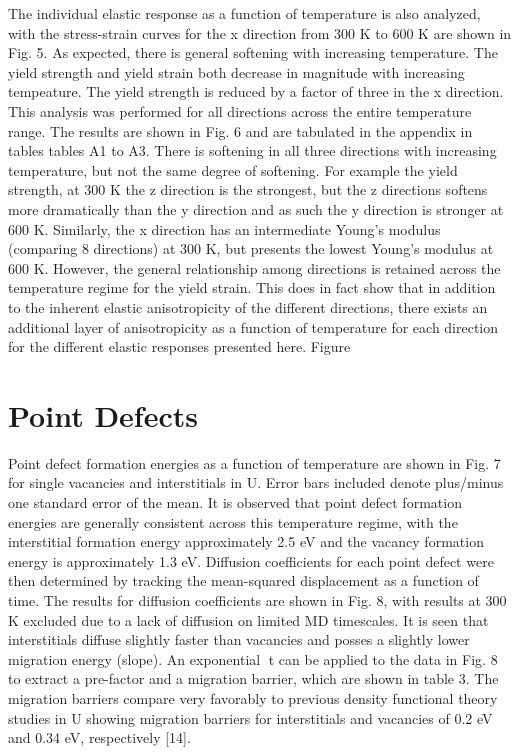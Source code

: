 \documentclass[review]{elsarticle}
\begin{document}
The individual elastic response as a function of temperature is also analyzed, with the stress-strain curves
for the x direction from 300 K to 600 K are shown in Fig. 5. As expected, there is general softening with
increasing temperature. The yield strength and yield strain both decrease in magnitude with increasing
tempeature. The yield strength is reduced by a factor of three in the x direction. This analysis was
performed for all directions across the entire temperature range. The results are shown in Fig. 6 and are
tabulated in the appendix in tables tables A1 to A3. There is softening in all three directions with increasing
temperature, but not the same degree of softening. For example the yield strength, at 300 K the z direction
is the strongest, but the z directions softens more dramatically than the y direction and as such the y
direction is stronger at 600 K. Similarly, the x direction has an intermediate Young's modulus (comparing
8
directions) at 300 K, but presents the lowest Young's modulus at 600 K. However, the general relationship
among directions is retained across the temperature regime for the yield strain. This does in fact show that
in addition to the inherent elastic anisotropicity of the different directions, there exists an additional layer
of anisotropicity as a function of temperature for each direction for the different elastic responses presented
here. Figure

\FloatBarrier

\section{Point Defects}

Point defect formation energies as a function of temperature are shown in Fig. 7 for single vacancies and interstitials in U. Error bars included denote plus/minus one standard error of the mean. It is observed that point defect formation energies are generally consistent across this temperature regime, with the interstitial
formation energy approximately 2.5 eV and the vacancy formation energy is approximately 1.3 eV. Diffusion coefficients for each point defect were then determined by tracking the mean-squared displacement as a function of time. The results for diffusion coefficients are shown in Fig. 8, with results at 300 K excluded
due to a lack of diffusion on limited MD timescales. It is seen that interstitials diffuse slightly faster than
vacancies and posses a slightly lower migration energy (slope). An exponential t can be applied to the data
in Fig. 8 to extract a pre-factor and a migration barrier, which are shown in table 3. The migration barriers
compare very favorably to previous density functional theory studies in U showing migration barriers for
interstitials and vacancies of 0.2 eV and 0.34 eV, respectively [14].
\end{document}
